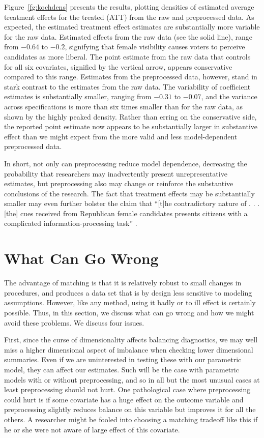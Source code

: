 \documentclass[11pt,titlepage]{article}
\begin{document}
Figure~\ref{fg:kochdens} presents the results, plotting densities of
estimated average treatment effects for the treated (ATT) from the raw
and preprocessed data.  As expected, the estimated treatment effect
estimates are substantially more variable for the raw data.  Estimated
effects from the raw data (see the solid line), range from $-0.64$ to
$-0.2$, signifying that female visibility causes voters to perceive
candidates as more liberal.  The point estimate from the raw data that
controls for all six covariates, signified by the vertical arrow,
appears conservative compared to this range.  Estimates from the
preprocessed data, however, stand in stark contrast to the estimates
from the raw data.  The variability of coefficient estimates is
substantially smaller, ranging from $-0.31$ to $-0.07$, and the
variance across specifications is more than six times smaller than for
the raw data, as shown by the highly peaked density.  Rather than
erring on the conservative side, the reported point estimate now
appears to be substantially larger in substantive effect than we might
expect from the more valid and less model-dependent preprocessed data.

In short, not only can preprocessing reduce model dependence,
decreasing the probability that researchers may inadvertently present
unrepresentative estimates, but preprocessing also may change or
reinforce the substantive conclusions of the research.  The fact that
treatment effects may be substantially smaller may even further
bolster the claim that ``[t]he contradictory nature of . . . [the]
cues received from Republican female candidates presents citizens with
a complicated information-processing task'' \citep[p. 460]{Koch02}.

\section{What Can Go Wrong}

The advantage of matching is that it is relatively robust to small
changes in procedures, and produces a data set that is by design less
sensitive to modeling assumptions.  However, like any method, using it
badly or to ill effect is certainly possible.  Thus, in this section,
we discuss what can go wrong and how we might avoid these problems.
We discuss four issues.

First, since the curse of dimensionality affects balancing
diagnostics, we may well miss a higher dimensional aspect of imbalance
when checking lower dimensional summaries.  Even if we are
uninterested in testing these with our parametric model, they can
affect our estimates.  Such will be the case with parametric models
with or without preprocessing, and so in all but the most unusual
cases at least preprocessing should not hurt.  One pathological case
where preprocessing could hurt is if some covariate has a huge effect
on the outcome variable and preprocessing slightly reduces balance on
this variable but improves it for all the others.  A researcher might
be fooled into choosing a matching tradeoff like this if he or she
were not aware of large effect of this covariate.
\end{document}
